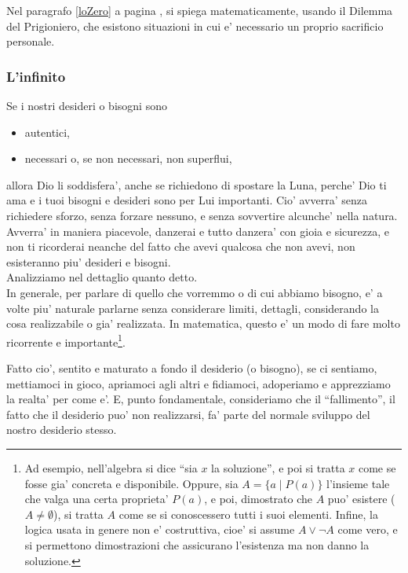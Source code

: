 Nel paragrafo \ref{loZero} a pagina \pageref{loZero}, si spiega matematicamente, usando il Dilemma del Prigioniero, che esistono situazioni in cui e' necessario un proprio sacrificio personale.

\subsubsection{L'infinito}

Se i nostri desideri o bisogni sono 
\begin{itemize}
    \item autentici,
    \item necessari o, se non necessari, non superflui,
\end{itemize}
allora Dio li soddisfera', anche se richiedono di spostare la Luna, perche' Dio ti ama e i tuoi bisogni e desideri sono per Lui importanti. Cio' avverra' senza richiedere sforzo, senza forzare nessuno, e senza sovvertire alcunche' nella natura. Avverra' in maniera piacevole, danzerai e tutto danzera' con gioia e sicurezza, e non ti ricorderai neanche del fatto che avevi qualcosa che non avevi, non esisteranno piu' desideri e bisogni.\\

Analizziamo nel dettaglio quanto detto.\\

In generale, per parlare di quello che vorremmo o di cui abbiamo bisogno, e' a volte piu' naturale parlarne senza considerare limiti, dettagli, considerando la cosa realizzabile o gia' realizzata. In matematica, questo e' un modo di fare molto ricorrente e importante\footnote{Ad esempio, nell'algebra si dice ``sia $x$ la soluzione'', e poi si tratta $x$ come se fosse gia' concreta e disponibile. Oppure, sia $A=\{a \;|\;P(a)\}$ l'insieme tale che valga una certa proprieta' $P(a)$, e poi, dimostrato che $A$ puo' esistere ($A\neq \emptyset$), si tratta $A$ come se si conoscessero tutti i suoi elementi. Infine, la logica usata in genere non e' costruttiva, cioe' si assume $A \lor \lnot A$ come vero, e si permettono dimostrazioni che assicurano l'esistenza ma non danno la soluzione.}.

Fatto cio', sentito e maturato a fondo il desiderio (o bisogno), se ci sentiamo, mettiamoci in gioco, apriamoci agli altri e fidiamoci, adoperiamo e apprezziamo la realta' per come e'. E, punto fondamentale, consideriamo che il ``fallimento'', il fatto che il desiderio puo' non realizzarsi, fa' parte del normale sviluppo del nostro desiderio stesso. 

